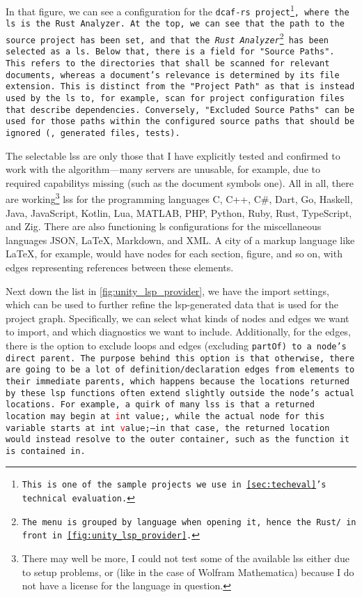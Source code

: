 \documentclass[../thesis]{subfiles}
\begin{document}
In that figure, we can see a configuration for the \tt{dcaf-rs} project\footnote{
	This is one of the sample projects we use in \cref{sec:techeval}'s technical evaluation.
}, where the \gls{ls} is the Rust Analyzer.
At the top, we can see that the path to the source project has been set, and that the \emph{Rust Analyzer}\footnote{
	The menu is grouped by language when opening it, hence the \texttt{Rust/} in front in \cref{fig:unity_lsp_provider}.
} has been selected as a \gls{ls}.
Below that, there is a field for "Source Paths".
This refers to the directories that shall be scanned for relevant documents, whereas a document's relevance is determined by its file extension.
This is distinct from the "Project Path" as that is instead used by the \gls{ls} to, for example, scan for project configuration files that describe dependencies.
Conversely, "Excluded Source Paths" can be used for those paths within the configured source paths that should be ignored (\eg, generated files, tests).

The selectable \glspl{ls} are only those that I have explicitly tested and confirmed to work with the algorithm---many servers are unusable, for example, due to required \glspl{capability} missing (such as the document symbols one).
All in all, there are working\footnote{
	There may well be more, I could not test some of the available \glspl{ls} either due to setup problems, or (like in the case of Wolfram Mathematica) because I do not have a license for the language in question.
} \glspl{ls} for the programming languages
C,
C++,
C\#,
Dart,
Go,
Haskell,
Java,
JavaScript,
Kotlin,
Lua,
MATLAB,
PHP,
Python,
Ruby,
Rust,
TypeScript,
and Zig.
There are also functioning \gls{ls} configurations for the miscellaneous languages
JSON,
\LaTeX{},
Markdown,
and XML.
A \gls{city} of a markup language like \LaTeX{}, for example, would have nodes for each section, figure, and so on, with edges representing references between these elements.

Next down the list in \cref{fig:unity_lsp_provider}, we have the import settings, which can be used to further refine the \gls{lsp}-generated data that is used for the project graph.
Specifically, we can select what kinds of nodes and edges we want to import, and which diagnostics we want to include.
Additionally, for the edges, there is the option to exclude loops and edges (excluding \tt{partOf}) to a node's direct parent.
The purpose behind this option is that otherwise, there are going to be a lot of definition/declaration edges from elements to their immediate parents, which happens because the locations returned by these \gls{lsp} functions often extend slightly outside the node's actual locations.
For example, a quirk of many \glspl{ls} is that a returned location may begin at \tt{\textcolor{red}{i}nt value;}, while the actual node for this variable starts at \tt{int \textcolor{red}{v}alue;}---in that case, the returned location would instead resolve to the outer container, such as the function it is contained in.
\end{document}
